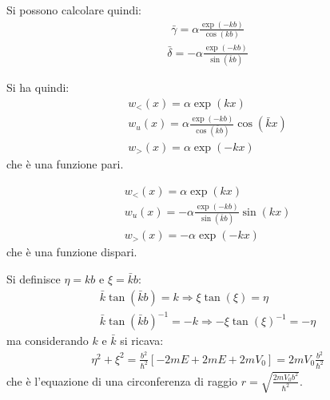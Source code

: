 Si possono calcolare quindi:
\begin{equation}\begin{split}
\bar \gamma=\alpha\frac{\exp{\left(-kb\right)}}{\cos{\left(kb\right)}}
\end{split}\end{equation}
\begin{equation}\begin{split}
\bar \delta=-\alpha\frac{\exp{\left(-kb\right)}}{\sin{\left(\bar kb\right)}}
\end{split}\end{equation}

Si ha quindi:
\begin{equation}\begin{split}
w_<\left(x\right)=\alpha\exp{\left(kx\right)}\\
w_u\left(x\right)=\alpha\frac{\exp{\left(-kb\right)}}{\cos{\left(\bar kb\right)}}\cos{\left(\bar kx\right)}\\
w_>\left(x\right)=\alpha \exp{\left(-kx\right)}
\end{split}\end{equation}
che è una funzione pari.

\begin{equation}\begin{split}
w_<\left(x\right)=\alpha\exp{\left(kx\right)}\\
w_u\left(x\right)=-\alpha\frac{\exp{\left(-kb\right)}}{\sin{\left(\bar kb\right)}}\sin{\left( kx\right)}\\
w_>\left(x\right)=-\alpha \exp{\left(-kx\right)}
\end{split}\end{equation}
che è una funzione dispari.

Si definisce $\eta=kb$ e $\xi=\bar kb$:
\begin{equation}\begin{split}
\bar k\tan{\left(\bar kb\right)}=k \Longrightarrow \xi\tan{\left(\xi\right)}=\eta \\
\bar k\tan{\left(\bar kb\right)}^{-1}=-k \Longrightarrow -\xi\tan{\left(\xi\right)}^{-1}=-\eta
\end{split}\end{equation}
ma considerando $k$ e $\bar k$ si ricava:
\begin{equation}\begin{split}
\eta^2+\xi^2=\frac{b^2}{\hbar ^2}\left[-2mE+2mE+2mV_0\right]=2mV_0\frac{b^2}{\hbar ^2}
\end{split}\end{equation}
che è l'equazione di una circonferenza di raggio $r=\sqrt{\frac{2mV_0b^2}{\hbar ^2}}$.

